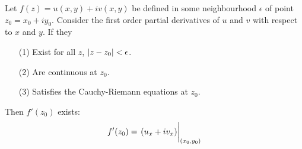 \documentclass[12pt, english]{book}
\begin{document}
	\begin{theorem}
		\label{Cauchy-Riemann Differentiablity Conditions Theorem - Complex}
		Let \(f(z) = u(x,y) + iv(x,y)\) be defined in some neighbourhood \(\epsilon\) of point \(z_0 = x_0 + iy_0\). Consider the first order partial derivatives of \(u\) and \(v\) with respect to \(x\) and \(y\). If they 
		\begin{itemize}
			\item[(1)] Exist for all \(z\), \(\abs{z-z_0}<\epsilon\).
			\item[(2)] Are continuous at \(z_0\).
			\item[(3)] Satisfies the Cauchy-Riemann equations at \(z_0\).
		\end{itemize}
		Then \(f'(z_0)\) exists:
		\[f'(z_0) = \eval{(u_x + iv_x)}_{(x_0, y_0)}\]
	\end{theorem}
\end{document}
